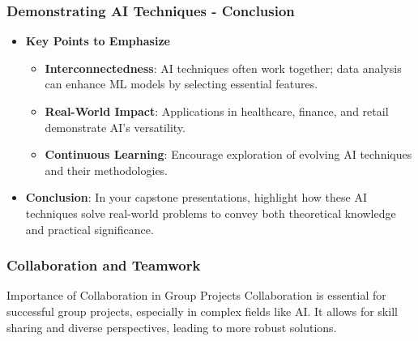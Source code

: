 \documentclass[aspectratio=169]{beamer}
\begin{document}
\begin{frame}[fragile]
    \frametitle{Demonstrating AI Techniques - Conclusion}
    \begin{itemize}
        \item \textbf{Key Points to Emphasize}
        \begin{itemize}
            \item \textbf{Interconnectedness}: AI techniques often work together; data analysis can enhance ML models by selecting essential features.
            \item \textbf{Real-World Impact}: Applications in healthcare, finance, and retail demonstrate AI's versatility.
            \item \textbf{Continuous Learning}: Encourage exploration of evolving AI techniques and their methodologies.
        \end{itemize}
        \item \textbf{Conclusion}: In your capstone presentations, highlight how these AI techniques solve real-world problems to convey both theoretical knowledge and practical significance.
    \end{itemize}
\end{frame}

\begin{frame}[fragile]
    \frametitle{Collaboration and Teamwork}
    \begin{block}{Importance of Collaboration in Group Projects}
        Collaboration is essential for successful group projects, especially in complex fields like AI. It allows for skill sharing and diverse perspectives, leading to more robust solutions.
    \end{block}
\end{frame}
\end{document}

